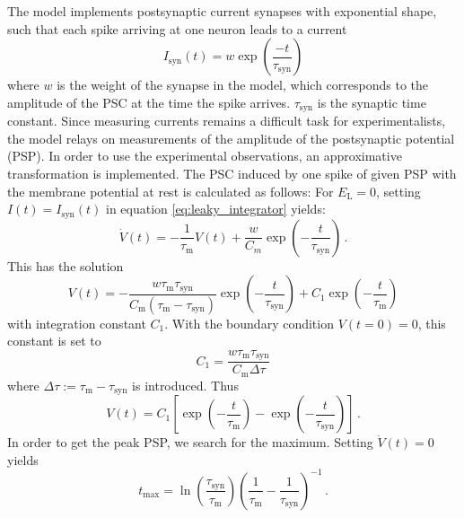The model implements  
postsynaptic current synapses with exponential shape, such that each 
spike arriving at one neuron leads to a current 
\begin{equation}
I_{\text{syn}}(t) = w \exp{\left(\frac{-t}{\tau_\text{syn}}\right)}	
    \label{eq:synaptic_current}
\end{equation}
where $w$ is the weight of the synapse in the model,
which corresponds to the amplitude of the PSC
at the time the spike arrives. 
$\tau_\text{syn}$ is the synaptic time constant.
Since measuring currents remains a difficult task for experimentalists, 
the model relays on measurements of the amplitude of the postsynaptic 
potential (PSP). In order to use the experimental observations,
an approximative transformation is implemented.
The PSC induced by one spike of given PSP with the membrane potential
at rest is calculated as follows:
For $E_\text{L} = 0$, setting $I(t) = I_\text{syn}(t)$ in equation \eqref{eq:leaky_integrator}
yields:
\begin{equation}
    \dot{V}(t)
    = - \frac{1}{\tau_\text{m}} V(t) + \frac{w}{C_m} \exp{\left(-\frac{t}{\tau_\text{syn}}\right)} \,.
    \label{eq:psc_ode}
\end{equation}
This has the solution 
\begin{equation}
    V(t) =   
        - \frac{w \tau_\text{m} \tau_\text{syn}} {C_\text{m} \left(\tau_\text{m} - \tau_\text{syn}\right)}	
        \exp{\left( -\frac{t}{\tau_\text{syn}} \right)} 
        + C_1 \exp{\left(-\frac{t}{\tau_\text{m}} \right)}
    \label{eq:psc_ode_sol}
\end{equation}
with integration constant $C_1$.
With the boundary condition $V(t = 0) = 0$, this constant is set to
\begin{equation}
    C_1 = \frac{w \tau_\text{m} \tau_\text{syn}}{C_\text{m} \Delta\tau}	
    \label{eq:C_1}
\end{equation}
where $\Delta\tau := \tau_\text{m} - \tau_\text{syn}$ is introduced.
Thus
\begin{equation}
    V(t) = C_1 \left[\exp\left(-\frac{t}{\tau_\text{m}}\right) - \exp\left(-\frac{t}{\tau_\text{syn}}\right)\right]	\,.  
    \label{eq:V(t)}
\end{equation}
In order to get the peak PSP, we search for the maximum. Setting $\dot{V}(t) = 0$ 
yields
\begin{equation}
    t_\text{max} 
        = \ln{\!\left(\frac{\tau_\text{syn}}{\tau_\text{m}}\right)} 
            \left(\frac{1}{\tau_\text{m}} - \frac{1}{\tau_\text{syn}}\right)^{-1} \,.
    \label{eq:t_max}
\end{equation}

